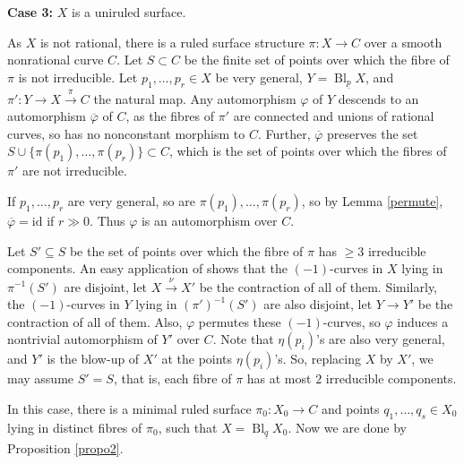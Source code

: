 \documentclass[11pt,letterpaper]{amsart}
\begin{document}
\noindent\textbf{Case 3:} $X$ is a uniruled surface.

As $X$ is not rational, there is a ruled surface structure $\pi:X\to C$ over a smooth nonrational curve $C$. Let $S\subset C$ be the finite set of points over which the fibre of $\pi$ is not irreducible. Let $p_1,\ldots,p_r\in X$ be very general, $Y=\operatorname{Bl}_{\underline{p}} X$, and $\pi':Y\to X\xrightarrow{\pi}C$ the natural map. Any automorphism $\varphi$ of $Y$ descends to an automorphism $\overline{\varphi}$ of $C$, as the fibres of $\pi'$ are connected and unions of rational curves, so has no nonconstant morphism to $C$. Further, $\overline{\varphi}$ preserves the set
 $S\cup\{\pi(p_1),\ldots,\pi(p_r)\}\subset C$, which is the set of points over which
the fibres of $\pi'$ are not irreducible.

If $p_1,\ldots,p_r$ are very general, so are $\pi(p_1),\ldots,\pi(p_r)$, so by Lemma \ref{permute}, $\overline{\varphi}=\mathrm{id}$ if $r\gg0$. Thus $\varphi$ is an automorphism over $C$.

Let $S'\subseteq S$ be the set of points over which the fibre of $\pi$ has $\geq 3$ irreducible components. An easy application of \cite[Proposition 1.18]{hassett2009rational} shows that the $(-1)$-curves in $X$ lying in $\pi^{-1}(S')$ are disjoint, let $X\xrightarrow{\nu}X'$ be the contraction of all of them. Similarly, the $(-1)$-curves in $Y$ lying in $(\pi')^{-1}(S')$ are also disjoint, let $Y\to Y'$ be the contraction of all of them. Also, $\varphi$ permutes these $(-1)$-curves, so $\varphi$ induces a nontrivial automorphism of $Y'$ over $C$. Note that $\eta(p_i)$'s are also very general, and $Y'$ is the blow-up of $X'$ at the points $\eta(p_i)$'s. So, replacing $X$ by $X'$, we may assume $S'=S$, that is, each fibre of $\pi$ has at most $2$ irreducible components.

In this case, there is a minimal ruled surface $\pi_0:X_0\to C$ and points $q_1,\ldots,q_s\in X_0$ lying in distinct fibres of $\pi_0$, such that $X=\operatorname{Bl}_{\underline{q}} X_0$. Now we are done by Proposition \ref{propo2}.
\end{document}
